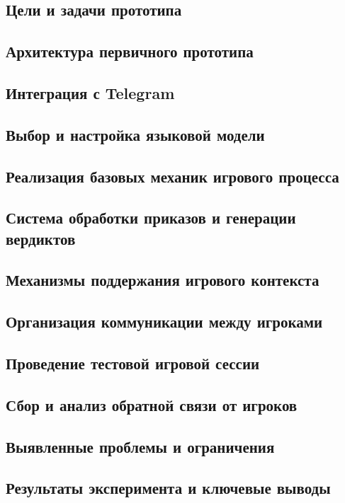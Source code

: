 \subsection{Цели и задачи прототипа}

\subsection{Архитектура первичного прототипа}

\subsection{Интеграция с Telegram}

\subsection{Выбор и настройка языковой модели}

\subsection{Реализация базовых механик игрового процесса}

\subsection{Система обработки приказов и генерации вердиктов}

\subsection{Механизмы поддержания игрового контекста}

\subsection{Организация коммуникации между игроками}

\subsection{Проведение тестовой игровой сессии}

\subsection{Сбор и анализ обратной связи от игроков}

\subsection{Выявленные проблемы и ограничения}

\subsection{Результаты эксперимента и ключевые выводы}
